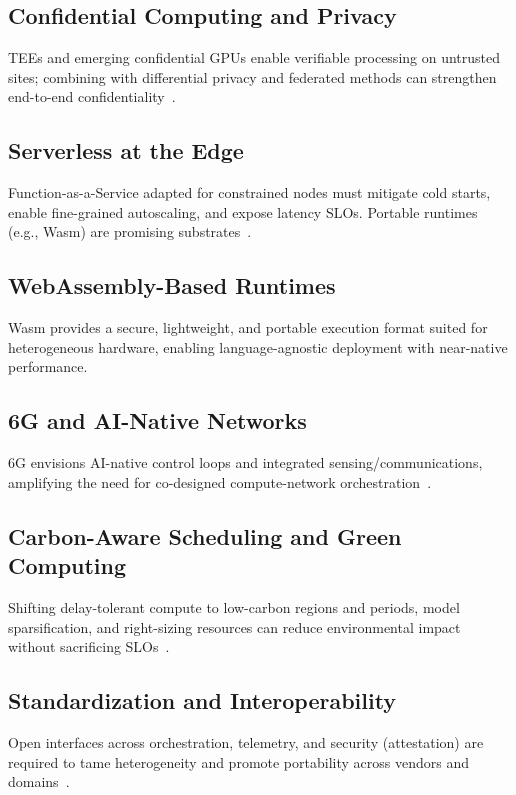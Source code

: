 \documentclass[conference]{IEEEtran}
\begin{document}
\subsection{Confidential Computing and Privacy}
TEEs and emerging confidential GPUs enable verifiable processing on untrusted sites; combining with differential privacy and federated methods can strengthen end-to-end confidentiality~\cite{Schuster2015VC3}.

\subsection{Serverless at the Edge}
Function-as-a-Service adapted for constrained nodes must mitigate cold starts, enable fine-grained autoscaling, and expose latency SLOs. Portable runtimes (e.g., Wasm) are promising substrates~\cite{Haas2017Wasm}.

\subsection{WebAssembly-Based Runtimes}
Wasm provides a secure, lightweight, and portable execution format suited for heterogeneous hardware, enabling language-agnostic deployment with near-native performance.

\subsection{6G and AI-Native Networks}
6G envisions AI-native control loops and integrated sensing/communications, amplifying the need for co-designed compute-network orchestration~\cite{Saad2019SixG}.

\subsection{Carbon-Aware Scheduling and Green Computing}
Shifting delay-tolerant compute to low-carbon regions and periods, model sparsification, and right-sizing resources can reduce environmental impact without sacrificing SLOs~\cite{Liu2015GLB}.

\subsection{Standardization and Interoperability}
Open interfaces across orchestration, telemetry, and security (attestation) are required to tame heterogeneity and promote portability across vendors and domains~\cite{ETSI2016MEC,OpenFog2017RA}.
\end{document}
